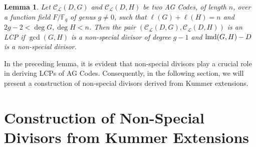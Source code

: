 \documentclass[journal,12pt,onecolumn]{IEEEtran}
\newtheorem{lemma}[theorem]{Lemma}
\begin{document}
\begin{lemma}\cite[Thm. 3.5]{On_linear_complementary_pairs_of_algebraic_geometry_codes}\label{LCP_criterion}
    Let $\mathcal{C}_{\mathcal{L}}(D,G)$ and $\mathcal{C}_{\mathcal{L}}(D,H)$ be two AG Codes, of length $n$, over a function field $F/\mathbb{F}_q$ of genus $g\neq 0$, such that $\ell (G) + \ell (H) = n $ and $2g-2<\deg G, \deg H<n$. Then the pair $(\mathcal{C}_{\mathcal{L}}(D,G),\mathcal{C}_{\mathcal{L}}(D,H))$ is an LCP if $\gcd(G,H)$ is a non-special divisor of degree $g-1$ and ${\rm lmd}(G,H)-D$ is a non-special divisor. 
\end{lemma}

In the preceding lemma, it is evident that non-special divisors play a crucial role in deriving LCPs of AG Codes. Consequently, in the following section, we will present a construction of non-special divisors derived from Kummer extensions.


















\section{Construction of Non-Special Divisors from Kummer Extensions}\label{construction}
\end{document}
